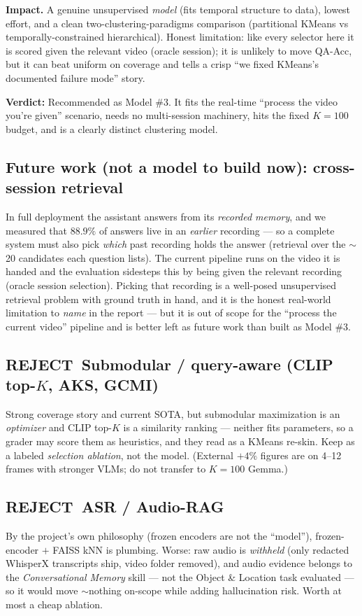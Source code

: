 \documentclass[11pt]{article}
\newcommand{\verdict}[2]{\par\smallskip\noindent\textbf{\color{#1}Verdict:} #2\par}
\newcommand{\rej}{\textbf{\color{hsred}REJECT}}
\begin{document}
\textbf{Impact.} A genuine unsupervised \emph{model} (fits temporal structure to data), lowest effort, and a clean two-clustering-paradigms comparison (partitional KMeans vs temporally-constrained hierarchical). Honest limitation: like every selector here it is scored given the relevant video (oracle session); it is unlikely to move QA-Acc, but it can beat uniform on coverage and tells a crisp ``we fixed KMeans's documented failure mode'' story.

\verdict{hsgreen}{Recommended as Model \#3. It fits the real-time ``process the video you're given'' scenario, needs no multi-session machinery, hits the fixed $K=100$ budget, and is a clearly distinct clustering model.}

\subsection{Future work (not a model to build now): cross-session retrieval}
In full deployment the assistant answers from its \emph{recorded memory}, and we measured that $88.9\%$ of answers live in an \emph{earlier} recording --- so a complete system must also pick \emph{which} past recording holds the answer (retrieval over the $\sim$20 candidates each question lists). The current pipeline runs on the video it is handed and the evaluation sidesteps this by being given the relevant recording (oracle session selection). Picking that recording is a well-posed unsupervised retrieval problem with ground truth in hand, and it is the honest real-world limitation to \emph{name} in the report --- but it is out of scope for the ``process the current video'' pipeline and is better left as future work than built as Model \#3.

\subsection{\rej\ Submodular / query-aware (CLIP top-$K$, AKS, GCMI)}
Strong coverage story and current SOTA, but submodular maximization is an \emph{optimizer} and CLIP top-$K$ is a similarity ranking --- neither fits parameters, so a grader may score them as heuristics, and they read as a KMeans re-skin. Keep as a labeled \emph{selection ablation}, not the model. (External $+4\%$ figures are on 4--12 frames with stronger VLMs; do not transfer to $K{=}100$ Gemma.)

\subsection{\rej\ ASR / Audio-RAG}
By the project's own philosophy (frozen encoders are not the ``model''), frozen-encoder $+$ FAISS kNN is plumbing. Worse: raw audio is \emph{withheld} (only redacted WhisperX transcripts ship, video folder removed), and audio evidence belongs to the \emph{Conversational Memory} skill --- not the Object \& Location task evaluated --- so it would move $\sim$nothing on-scope while adding hallucination risk. Worth at most a cheap ablation.
\end{document}

